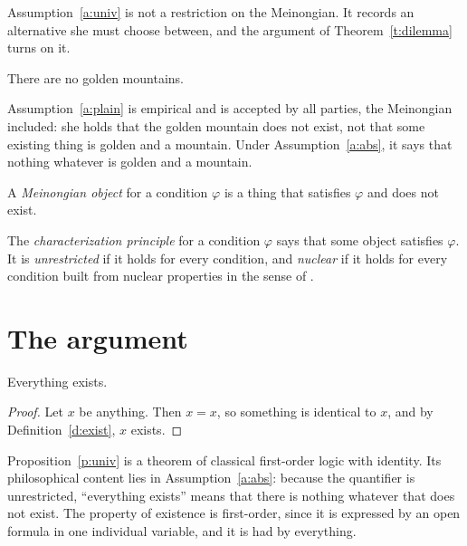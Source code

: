 \documentclass{situationist-preprint}
\begin{document}
Assumption~\ref{a:univ} is not a restriction on the Meinongian. It records an alternative she must choose between, and the argument of Theorem~\ref{t:dilemma} turns on it.

\begin{assumption}\label{a:plain}
There are no golden mountains.
\end{assumption}

Assumption~\ref{a:plain} is empirical and is accepted by all parties, the Meinongian included: she holds that the golden mountain does not exist, not that some existing thing is golden and a mountain. Under Assumption~\ref{a:abs}, it says that nothing whatever is golden and a mountain.

\begin{definition}\label{d:mobj}
A \emph{Meinongian object} for a condition $\varphi$ is a thing that satisfies $\varphi$ and does not exist.
\end{definition}

\begin{definition}[Characterization]\label{d:cp}
The \emph{characterization principle} for a condition $\varphi$ says that some object satisfies $\varphi$. It is \emph{unrestricted} if it holds for every condition, and \emph{nuclear} if it holds for every condition built from nuclear properties in the sense of \citet{Parsons1980}.
\end{definition}

\section{The argument}\label{s:arg}

\begin{proposition}[Universality]\label{p:univ}
Everything exists.
\end{proposition}

\begin{proof}
Let $x$ be anything. Then $x = x$, so something is identical to $x$, and by Definition~\ref{d:exist}, $x$ exists.
\end{proof}

Proposition~\ref{p:univ} is a theorem of classical first-order logic with identity. Its philosophical content lies in Assumption~\ref{a:abs}: because the quantifier is unrestricted, \enquote{everything exists} means that there is nothing whatever that does not exist. The property of existence is first-order, since it is expressed by an open formula in one individual variable, and it is had by everything.
\end{document}
